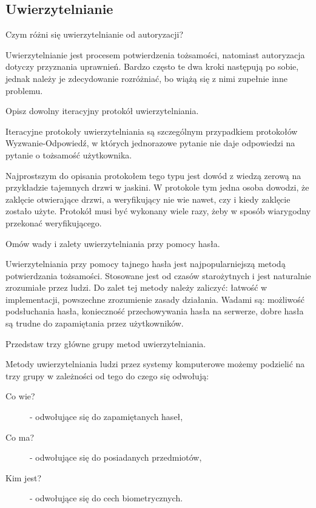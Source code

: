 \documentclass[answers,11pt]{exam}
\begin{document}
\subsection{Uwierzytelnianie}

\begin{questions}


\question Czym różni się uwierzytelnianie od autoryzacji?
\begin{solution}
Uwierzytelnianie jest procesem potwierdzenia tożsamości, natomiast autoryzacja dotyczy przyznania uprawnień. Bardzo często te dwa kroki następują po sobie, jednak należy je zdecydowanie rozróżniać, bo wiążą się z nimi zupełnie inne problemu.
\end{solution}

\question Opisz dowolny iteracyjny protokół uwierzytelniania.
\begin{solution}
Iteracyjne protokoły uwierzytelniania są szczególnym przypadkiem protokołów Wyzwanie-Odpowiedź, w których jednorazowe pytanie nie daje odpowiedzi na pytanie o tożsamość użytkownika. 

Najprostszym do opisania protokołem tego typu jest dowód z wiedzą zerową na przykładzie tajemnych drzwi w jaskini. W protokole tym jedna osoba dowodzi, że zaklęcie otwierające drzwi, a weryfikujący nie wie nawet, czy i kiedy zaklęcie zostało użyte. Protokół musi być wykonany wiele razy, żeby w sposób wiarygodny przekonać weryfikującego.
\end{solution}

\question Omów wady i zalety uwierzytelniania przy pomocy hasła.
\begin{solution}
Uwierzytelniania przy pomocy tajnego hasła jest najpopularniejszą metodą potwierdzania tożsamości. Stosowane jest od czasów starożytnych i jest naturalnie zrozumiałe przez ludzi. 
Do zalet tej metody należy zaliczyć: łatwość w implementacji, powszechne zrozumienie zasady działania.
Wadami są: możliwość podsłuchania hasła, konieczność przechowywania hasła na serwerze, dobre hasła są trudne do zapamiętania przez użytkowników.
\end{solution}

\question Przedstaw trzy główne grupy metod uwierzytelniania.
\begin{solution}
Metody uwierzytelniania ludzi przez systemy komputerowe możemy podzielić na trzy grupy w zależności od tego do czego się odwołują:
\begin{description}
\item[Co wie?] - odwołujące się do zapamiętanych haseł,
\item[Co ma?] - odwołujące się do posiadanych przedmiotów,
\item[Kim jest?] - odwołujące się do cech biometrycznych.
\end{description}
\end{solution}


\end{questions}
\end{document}

